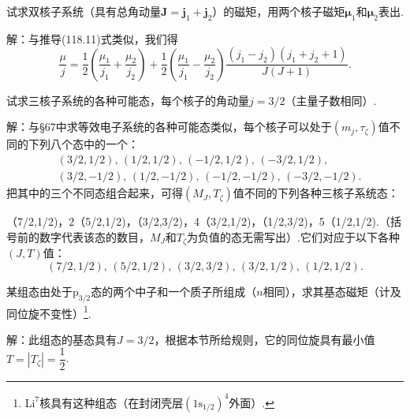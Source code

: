 \begin{xiti}
\setcounter{equation}{0}%

\quad 试求双核子系统（具有总角动量$\boldsymbol{J}=\boldsymbol{j}_1+\boldsymbol{j}_2$）的磁矩，用两个核子磁矩$\boldsymbol{\mu}_1$和$\boldsymbol{\mu}_2$表出.

解：与推导(118.11)式类似，我们得
\begin{equation*}
  \frac{\mu}{j}=\frac{1}{2}\left(\frac{\mu_1}{j_1}+\frac{\mu_2}{j_2}\right)
  +\frac{1}{2}\left(\frac{\mu_1}{j_1}-\frac{\mu_2}{j_2}\right)
  \frac{\left(j_1-j_2\right)\left(j_1+j_2+1\right)}{J(J+1)}.
\end{equation*}

\quad 试求三核子系统的各种可能态，每个核子的角动量$j=3/2$（主量子数相同）.

解：与§67中求等效电子系统的各种可能态类似，每个核子可以处于$(m_j,\tau_\zeta)$值不同的下列八个态中的一个：
\begin{equation*}
\begin{aligned}
  &(3/2,1/2),\,(1/2,1/2),\,(-1/2,1/2),\,(-3/2,1/2),\\
  &(3/2,-1/2),\,(1/2,-1/2),\,(-1/2,-1/2),\,(-3/2,-1/2).
\end{aligned}
\end{equation*}
把其中的三个不同态组合起来，可得$(M_J,T_\zeta)$值不同的下列各种三核子系统态：

（7/2,1/2)，2（5/2,1/2)，（3/2,3/2)，4（3/2,1/2)，（1/2,3/2)，5（1/2,1/2).（括号前的数字代表该态的数目，$M_J$和$T_\zeta$为负值的态无需写出）.它们对应于以下各种$(J,T)$值：
\begin{equation*}
  (7/2,1/2),\,(5/2,1/2),\,(3/2,3/2),\,(3/2,1/2),\,(1/2,1/2).
\end{equation*}

\quad 某组态由处于$\mathrm{p}_{3/2}$态的两个中子和一个质子所组成（$n$相同），求其基态磁矩（计及同位旋不变性）\footnote{$\mathrm{Li}^7$核具有这种组态（在封闭壳层$(1\mathrm{s}_{1/2})^4$外面）.}.

解：此组态的基态具有$J=3/2$，根据本节所给规则，它的同位旋具有最小值$T=|T_\zeta|=\dfrac{1}{2}$.


\end{xiti}

